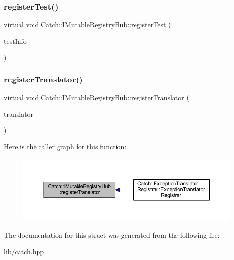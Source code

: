\hypertarget{struct_catch_1_1_i_mutable_registry_hub_a11b85c6744d88c9f83fe16ad4a8dd451}{}\label{struct_catch_1_1_i_mutable_registry_hub_a11b85c6744d88c9f83fe16ad4a8dd451} 
\subsubsection{\texorpdfstring{register\+Test()}{registerTest()}}
{\footnotesize\ttfamily virtual void Catch\+::\+I\+Mutable\+Registry\+Hub\+::register\+Test (\begin{DoxyParamCaption}\item[{\hyperlink{class_catch_1_1_test_case}{Test\+Case} const \&}]{test\+Info }\end{DoxyParamCaption})\hspace{0.3cm}{\ttfamily [pure virtual]}}

\hypertarget{struct_catch_1_1_i_mutable_registry_hub_ae6825365102693cf7707db022a2c2b49}{}\label{struct_catch_1_1_i_mutable_registry_hub_ae6825365102693cf7707db022a2c2b49} 
\subsubsection{\texorpdfstring{register\+Translator()}{registerTranslator()}}
{\footnotesize\ttfamily virtual void Catch\+::\+I\+Mutable\+Registry\+Hub\+::register\+Translator (\begin{DoxyParamCaption}\item[{const \hyperlink{struct_catch_1_1_i_exception_translator}{I\+Exception\+Translator} $\ast$}]{translator }\end{DoxyParamCaption})\hspace{0.3cm}{\ttfamily [pure virtual]}}

Here is the caller graph for this function\+:\nopagebreak
\begin{figure}[H]
\begin{center}
\leavevmode
\includegraphics[width=350pt]{struct_catch_1_1_i_mutable_registry_hub_ae6825365102693cf7707db022a2c2b49_icgraph}
\end{center}
\end{figure}


The documentation for this struct was generated from the following file\+:\begin{DoxyCompactItemize}
\item 
lib/\hyperlink{catch_8hpp}{catch.\+hpp}\end{DoxyCompactItemize}
